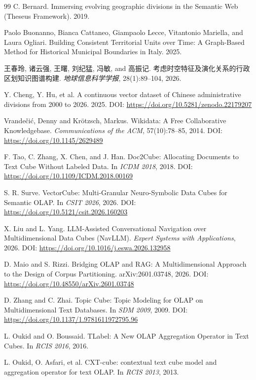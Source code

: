 \begin{thebibliography}{99}
 C. Bernard. Immersing evolving geographic divisions in the Semantic Web (Theseus Framework). 2019.

 Paolo Buonanno, Bianca Cattaneo, Giampaolo Lecce, Vitantonio Mariella, and Laura Ogliari. Building Consistent Territorial Units over Time: A Graph-Based Method for Historical Municipal Boundaries in Italy. 2025.

 王春玲, 诸云强, 王曙, 刘纪猛, 冯敏, and 高振记. 考虑时空特征及演化关系的行政区划知识图谱构建. \emph{地球信息科学学报}, 28(1):89–104, 2026.

 Y. Cheng, Y. Hu, et al. A continuous vector dataset of Chinese administrative divisions from 2000 to 2026. 2025. DOI: \url{https://doi.org/10.5281/zenodo.22179207}

 Vrandečić, Denny and Kr{\"o}tzsch, Markus. Wikidata: A Free Collaborative Knowledgebase. \emph{Communications of the ACM}, 57(10):78–85, 2014. DOI: \url{https://doi.org/10.1145/2629489}

 F. Tao, C. Zhang, X. Chen, and J. Han. Doc2Cube: Allocating Documents to Text Cube Without Labeled Data. In \emph{ICDM 2018}, 2018. DOI: \url{https://doi.org/10.1109/ICDM.2018.00169}

 S. R. Surve. VectorCube: Multi-Granular Neuro-Symbolic Data Cubes for Semantic OLAP. In \emph{CSIT 2026}, 2026. DOI: \url{https://doi.org/10.5121/csit.2026.160203}

 X. Liu and L. Yang. LLM-Assisted Conversational Navigation over Multidimensional Data Cubes (NavLLM). \emph{Expert Systems with Applications}, 2026. DOI: \url{https://doi.org/10.1016/j.eswa.2026.132958}

 D. Maio and S. Rizzi. Bridging OLAP and RAG: A Multidimensional Approach to the Design of Corpus Partitioning. arXiv:2601.03748, 2026. DOI: \url{https://doi.org/10.48550/arXiv.2601.03748}

 D. Zhang and C. Zhai. Topic Cube: Topic Modeling for OLAP on Multidimensional Text Databases. In \emph{SDM 2009}, 2009. DOI: \url{https://doi.org/10.1137/1.9781611972795.96}

 L. Oukid and O. Boussaid. TLabel: A New OLAP Aggregation Operator in Text Cubes. In \emph{RCIS 2016}, 2016.

 L. Oukid, O. Asfari, et al. CXT-cube: contextual text cube model and aggregation operator for text OLAP. In \emph{RCIS 2013}, 2013.


\end{thebibliography}
